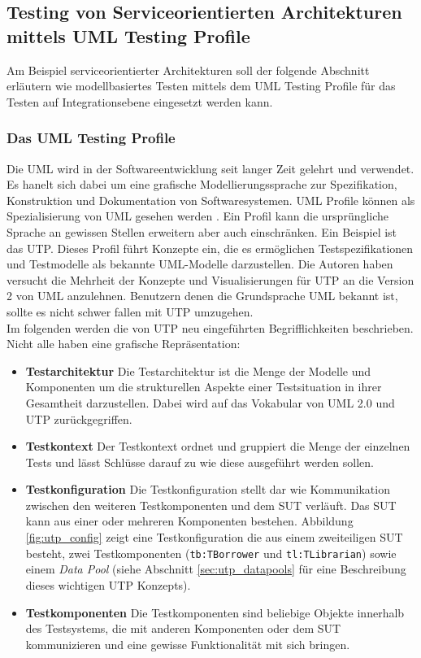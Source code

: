\subsection{Testing von Serviceorientierten Architekturen mittels UML Testing Profile}
\label{sec:utp}
Am Beispiel serviceorientierter Architekturen soll der folgende Abschnitt erläutern wie modellbasiertes Testen mittels dem UML Testing Profile für das Testen auf Integrationsebene eingesetzt werden kann. 
\subsubsection{Das UML Testing Profile}
Die \Gls{UML} wird in der Softwareentwicklung seit langer Zeit gelehrt und verwendet. Es hanelt sich dabei um eine grafische Modellierungssprache zur Spezifikation, Konstruktion und Dokumentation von Softwaresystemen. \Gls{UML} Profile können als Spezialisierung von \Gls{UML} gesehen werden \cite{_model-driven_2007}. Ein Profil kann die ursprüngliche Sprache an gewissen Stellen erweitern aber auch einschränken. Ein Beispiel ist das \Gls{UTP}. Dieses Profil führt Konzepte ein, die es ermöglichen Testspezifikationen und Testmodelle als bekannte \Gls{UML}-Modelle darzustellen. Die Autoren \cite{_model-driven_2007} haben versucht die Mehrheit der Konzepte und Visualisierungen für \Gls{UTP} an die Version 2 von \Gls{UML} anzulehnen. Benutzern denen die Grundsprache \Gls{UML} bekannt ist, sollte es nicht schwer fallen mit \gls{UTP} umzugehen.\\
Im folgenden werden die von \Gls{UTP} neu eingeführten Begrifflichkeiten beschrieben. Nicht alle haben eine grafische Repräsentation:

\begin{itemize}
\item \textbf{Testarchitektur} Die Testarchitektur ist die Menge der Modelle und Komponenten um die strukturellen Aspekte einer Testsituation in ihrer Gesamtheit darzustellen. Dabei wird auf das Vokabular von \Gls{UML} 2.0 und \Gls{UTP} zurückgegriffen.
\item \textbf{Testkontext} Der Testkontext ordnet und gruppiert die Menge der einzelnen Tests und lässt Schlüsse darauf zu wie diese ausgeführt werden sollen.
\item \textbf{Testkonfiguration} Die Testkonfiguration stellt dar wie Kommunikation zwischen den weiteren Testkomponenten und dem \Gls{SUT} verläuft. Das \Gls{SUT} kann aus einer oder mehreren Komponenten bestehen. Abbildung \ref{fig:utp_config} zeigt eine Testkonfiguration die aus einem zweiteiligen \Gls{SUT} besteht, zwei Testkomponenten (\texttt{tb:TBorrower} und \texttt{tl:TLibrarian}) sowie einem \textit{Data Pool} (siehe Abschnitt \ref{sec:utp_datapools} für eine Beschreibung dieses wichtigen \Gls{UTP} Konzepts).
\item \textbf{Testkomponenten} Die Testkomponenten sind beliebige Objekte innerhalb des Testsystems, die mit anderen Komponenten oder dem \Gls{SUT} kommunizieren und eine gewisse Funktionalität mit sich bringen.
\end{itemize}

